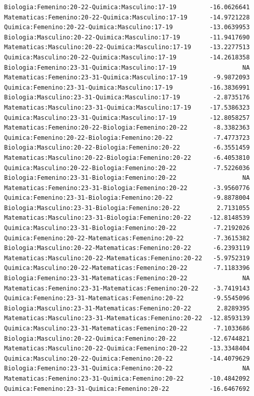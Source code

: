 \documentclass{rapport}
\begin{document}
\begin{itemize}
\begin{verbatim}
Biologia:Femenino:20-22-Quimica:Masculino:17-19         -16.0626641
Matematicas:Femenino:20-22-Quimica:Masculino:17-19      -14.9721228
Quimica:Femenino:20-22-Quimica:Masculino:17-19          -13.0639953
Biologia:Masculino:20-22-Quimica:Masculino:17-19        -11.9417690
Matematicas:Masculino:20-22-Quimica:Masculino:17-19     -13.2277513
Quimica:Masculino:20-22-Quimica:Masculino:17-19         -14.2618358
Biologia:Femenino:23-31-Quimica:Masculino:17-19                  NA
Matematicas:Femenino:23-31-Quimica:Masculino:17-19       -9.9872093
Quimica:Femenino:23-31-Quimica:Masculino:17-19          -16.3836991
Biologia:Masculino:23-31-Quimica:Masculino:17-19         -2.8735176
Matematicas:Masculino:23-31-Quimica:Masculino:17-19     -17.5386323
Quimica:Masculino:23-31-Quimica:Masculino:17-19         -12.8058257
Matematicas:Femenino:20-22-Biologia:Femenino:20-22       -8.3382363
Quimica:Femenino:20-22-Biologia:Femenino:20-22           -7.4773723
Biologia:Masculino:20-22-Biologia:Femenino:20-22         -6.3551459
Matematicas:Masculino:20-22-Biologia:Femenino:20-22      -6.4053810
Quimica:Masculino:20-22-Biologia:Femenino:20-22          -7.5226036
Biologia:Femenino:23-31-Biologia:Femenino:20-22                  NA
Matematicas:Femenino:23-31-Biologia:Femenino:20-22       -3.9560776
Quimica:Femenino:23-31-Biologia:Femenino:20-22           -9.8878004
Biologia:Masculino:23-31-Biologia:Femenino:20-22          2.7131055
Matematicas:Masculino:23-31-Biologia:Femenino:20-22     -12.8148539
Quimica:Masculino:23-31-Biologia:Femenino:20-22          -7.2192026
Quimica:Femenino:20-22-Matematicas:Femenino:20-22        -7.3615382
Biologia:Masculino:20-22-Matematicas:Femenino:20-22      -6.2393119
Matematicas:Masculino:20-22-Matematicas:Femenino:20-22   -5.9752319
Quimica:Masculino:20-22-Matematicas:Femenino:20-22       -7.1183396
Biologia:Femenino:23-31-Matematicas:Femenino:20-22               NA
Matematicas:Femenino:23-31-Matematicas:Femenino:20-22    -3.7419143
Quimica:Femenino:23-31-Matematicas:Femenino:20-22        -9.5545096
Biologia:Masculino:23-31-Matematicas:Femenino:20-22       2.8289395
Matematicas:Masculino:23-31-Matematicas:Femenino:20-22  -12.8593139
Quimica:Masculino:23-31-Matematicas:Femenino:20-22       -7.1033686
Biologia:Masculino:20-22-Quimica:Femenino:20-22         -12.6744821
Matematicas:Masculino:20-22-Quimica:Femenino:20-22      -13.3348404
Quimica:Masculino:20-22-Quimica:Femenino:20-22          -14.4079629
Biologia:Femenino:23-31-Quimica:Femenino:20-22                   NA
Matematicas:Femenino:23-31-Quimica:Femenino:20-22       -10.4842092
Quimica:Femenino:23-31-Quimica:Femenino:20-22           -16.6467692

\end{verbatim}
\end{itemize}
\end{document}
